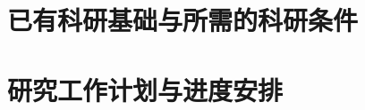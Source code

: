 \documentclass{Style/ucasproposal}%
\begin{document}
\section{已有科研基础与所需的科研条件}



\section{研究工作计划与进度安排}





\end{document}
